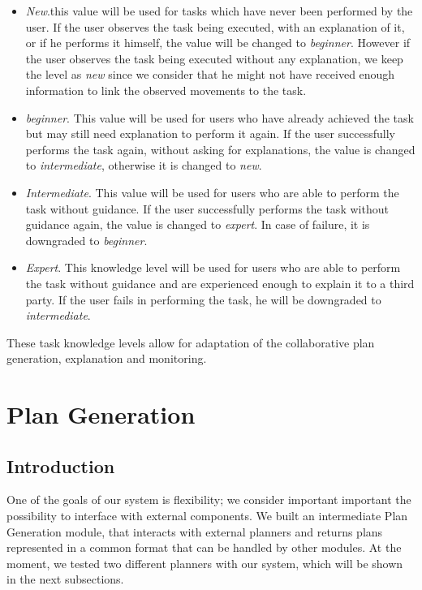 \begin{itemize}
\item \textit{New}.this value will be used for tasks which have never been performed by the user. If the user observes the task being executed, with an explanation of it, or if he performs it himself, the value will be changed to \textit{beginner}. However if the user observes the task being executed without any explanation, we  keep the level as \textit{new} since we consider that he might not have received enough information to link the observed movements to the task.
\item \textit{beginner}. This value will be used for users who have already achieved the task but may still need explanation to perform it again. If the user successfully performs the task again, without asking for explanations, the value is changed to \textit{intermediate}, otherwise it is changed to \textit{new}.
\item \textit{Intermediate}. This value will be used for users who are able to perform the task without guidance. If the user successfully performs the task without guidance again, the value is changed to \textit{expert}. In case of failure, it is downgraded to \textit{beginner}.
\item \textit{Expert}. This knowledge level will be used for users who are able to perform the task without guidance and are experienced enough to explain it to a third party. If the user fails in performing the task, he will be downgraded to \textit{intermediate}.
\end{itemize}

These task knowledge levels allow for adaptation of the collaborative plan generation, explanation and monitoring.


\section{Plan Generation}
\label{sec-plan_management-plan_generation}
\subsection{Introduction}
\label{subsec-plan_management_hatp}
One of the goals of our system is flexibility; we consider important important the possibility to interface with external components. We built an intermediate Plan Generation module, that interacts with external planners and returns plans represented in a common format that can be handled by other modules. At the moment, we tested two different planners with our system, which will be shown in the next subsections.

